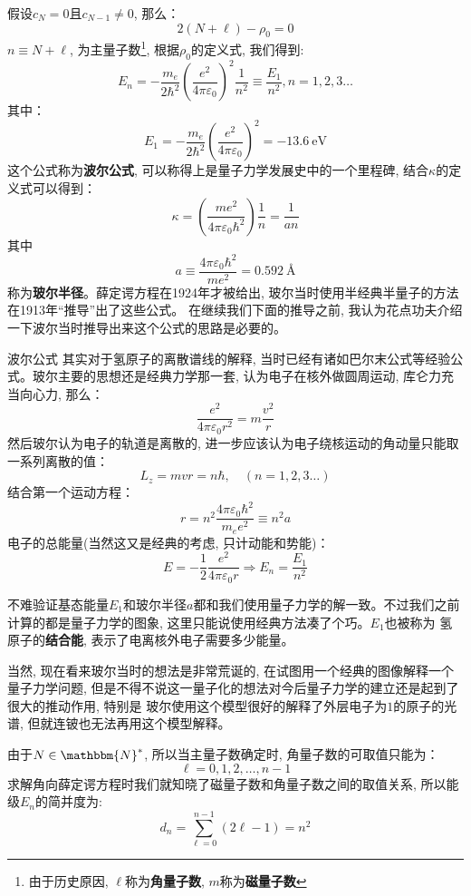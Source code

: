 \documentclass[a4paper,zihao=-4,linespread=1]{ctexrep}
\newenvironment{lequation}{\large\begin{equation}}{\end{equation}}
\begin{document}
    假设$c_N=0$且$c_{N-1}\neq 0$, 那么：
    \[2\left(N+\ell\right)-\rho_0=0\]
    $n\equiv N+\ell$, 为主量子数\footnote{由于历史原因, $\ell$称为\textbf{角量子数}, $m$称为\textbf{磁量子数}}, 根据$\rho_0$的定义式, 我们得到:
    \begin{lequation}
        \boxed{
            E_n=-\frac{m_e}{2\hbar^2}\left(\frac{e^2}{4\pi\varepsilon_0}\right)^2\frac{1}{n^2}\equiv\frac{E_1}{n^2}, n=1,2,3\ldots
        }
    \end{lequation}
    其中：
    \begin{lequation}
        \boxed{
            E_1=-\frac{m_e}{2\hbar^2}\left(\frac{e^2}{4\pi\varepsilon_0}\right)^2=\SI{-13.6}{\eV}
        }
    \end{lequation}
    这个公式称为\textbf{波尔公式}, 可以称得上是量子力学发展史中的一个里程碑, 结合$\kappa$的定义式可以得到：
    \[\kappa=\left(\frac{m e^{2}}{4 \pi \varepsilon_{0} \hbar^{2}}\right) \frac{1}{n}=\frac{1}{a n}\]
    其中
    \begin{equation}
        \boxed{
            a\equiv\frac{4 \pi \varepsilon_{0} \hbar^{2}}{m e^{2}}=\SI{0.592}{\angstrom}
        }
    \end{equation}
    称为\textbf{玻尔半径}。薛定谔方程在1924年才被给出, 玻尔当时使用半经典半量子的方法在1913年“推导”出了这些公式。
    在继续我们下面的推导之前, 我认为花点功夫介绍一下波尔当时推导出来这个公式的思路是必要的。
    \begin{history}{波尔公式}
        \setlength\parindent{2em}其实对于氢原子的离散谱线的解释, 当时已经有诸如巴尔末公式等经验公式。玻尔主要的思想还是经典力学那一套, 认为电子在核外做圆周运动, 库仑力充当向心力, 那么：
        \[\frac{e^2}{4\pi\varepsilon_0r^2}=m\frac{v^2}{r}\]
        然后玻尔认为电子的轨道是离散的, 进一步应该认为电子绕核运动的角动量只能取一系列离散的值：
        \[L_z=mvr=n\hbar,\quad (n=1,2,3\ldots)\]
        结合第一个运动方程：
        \[r=n^2\frac{4\pi\varepsilon_0\hbar^2}{m_ee^2}\equiv n^2 a\]
        电子的总能量(当然这又是经典的考虑, 只计动能和势能)：
        \[E=-\frac{1}{2}\frac{e^2}{4\pi\varepsilon_0r}\Rightarrow E_n=\frac{E_1}{n^2}\]
        
        \setlength\parindent{2em}不难验证基态能量$E_1$和玻尔半径$a$都和我们使用量子力学的解一致。不过我们之前计算的都是量子力学的图象, 这里只能说使用经典方法凑了个巧。$E_1$也被称为
        氢原子的\textbf{结合能}, 表示了电离核外电子需要多少能量。
        
        \setlength\parindent{2em}当然, 现在看来玻尔当时的想法是非常荒诞的, 在试图用一个经典的图像解释一个量子力学问题, 但是不得不说这一量子化的想法对今后量子力学的建立还是起到了很大的推动作用, 特别是
        玻尔使用这个模型很好的解释了外层电子为$1$的原子的光谱, 但就连铍也无法再用这个模型解释。
    \end{history}
    由于$N\in\mathbbm{N}^*$, 所以当主量子数确定时, 角量子数的可取值只能为：
    \[\ell=0,1,2,\ldots,n-1\]
    求解角向薛定谔方程时我们就知晓了磁量子数和角量子数之间的取值关系, 所以能级$E_n$的简并度为:
    \[d_n=\sum\limits_{\ell=0}^{n-1}{\left(2\ell-1\right)}=n^2\]
\end{document}
